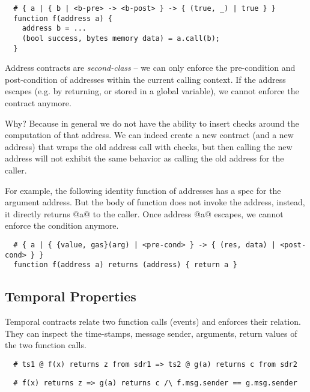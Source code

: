 \begin{lstlisting}
  # { a | { b | <b-pre> -> <b-post> } -> { (true, _) | true } }
  function f(address a) {
    address b = ...
    (bool success, bytes memory data) = a.call(b);
  }
\end{lstlisting}

Address contracts are \emph{second-class} -- we can only enforce the
pre-condition and post-condition of addresses within the current calling
context.  If the address escapes (e.g. by returning, or stored in a global
variable), we cannot enforce the contract anymore.

Why? Because in general we do not have the ability to insert checks around the
computation of that address. We can indeed create a new contract (and a new address) that wraps the old address call with checks, but then calling
the new address will not exhibit the same behavior as calling the old address
for the caller.

For example, the following identity function of addresses has a spec
for the argument address. But the body of function does not invoke
the address, instead, it directly returns @a@ to the caller.
Once address @a@ escapes, we cannot enforce the condition anymore.

\begin{lstlisting}
  # { a | { {value, gas}(arg) | <pre-cond> } -> { (res, data) | <post-cond> } }
  function f(address a) returns (address) { return a }
\end{lstlisting}

\subsection{Temporal Properties}

Temporal contracts relate two function calls (events) and enforces their
relation.
They can inspect the time-stamps, message sender, arguments, return values
of the two function calls.

\begin{lstlisting}
  # ts1 @ f(x) returns z from sdr1 => ts2 @ g(a) returns c from sdr2
\end{lstlisting}
\begin{lstlisting}
  # f(x) returns z => g(a) returns c /\ f.msg.sender == g.msg.sender
\end{lstlisting}

